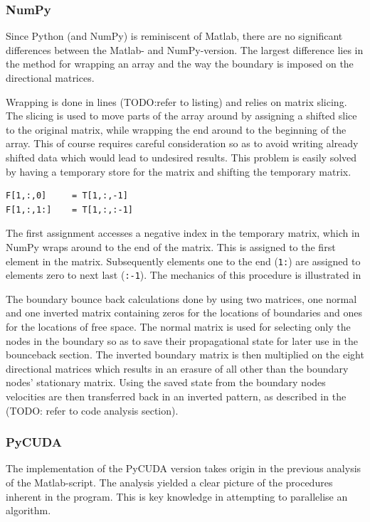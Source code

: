 \subsubsection{NumPy}
Since Python (and NumPy) is reminiscent of Matlab, there are no significant differences between the Matlab- and NumPy-version. The largest difference lies in the method for wrapping an array and the way the boundary is imposed on the directional matrices.

Wrapping is done in lines (TODO:refer to listing) and relies on matrix slicing. The slicing is used to move parts of the array around by assigning a shifted slice to the original matrix, while wrapping the end around to the beginning of the array. This of course requires careful consideration so as to avoid writing already shifted data which would lead to undesired results. This problem is easily solved by having a temporary store for the matrix and shifting the temporary matrix.

\begin{verbatim}
F[1,:,0]     = T[1,:,-1]
F[1,:,1:]    = T[1,:,:-1]
\end{verbatim}

The first assignment accesses a negative index in the temporary matrix, which in NumPy wraps around to the end of the matrix. This is assigned to the first element in the matrix. Subsequently elements one to the end (\texttt{1:}) are assigned to elements zero to next last (\texttt{:-1}). The mechanics of this procedure is illustrated in 


The boundary bounce back calculations done by using two matrices, one normal and one inverted matrix containing zeros for the locations of boundaries and ones for the locations of free space. The normal matrix is used for selecting only the nodes in the boundary so as to save their propagational state for later use in the bounceback section. The inverted boundary matrix is then multiplied on the eight directional matrices which results in an erasure of all other than the boundary nodes' stationary matrix. Using the saved state from the boundary nodes velocities are then transferred back in an inverted pattern, as described in the (TODO: refer to code analysis section).



\subsubsection{PyCUDA}
The implementation of the PyCUDA version takes origin in the previous analysis of the Matlab-script. The analysis yielded a clear picture of the procedures inherent in the program. This is key knowledge in attempting to parallelise an algorithm.

